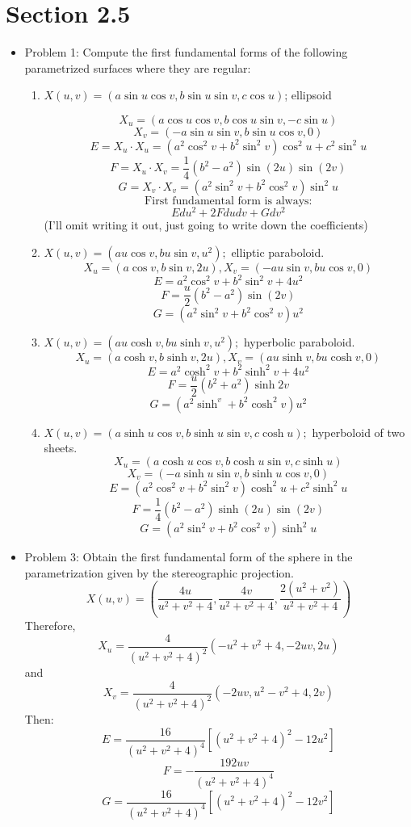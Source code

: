 \documentclass[a4paper,17pt]{extarticle}
\title{\scalebox{1.5}{Math 553 Homework 5}}
\author{\scalebox{1.5}{Theo Koss}}
\date{April 2022}
\theoremstyle{definition}
\renewcommand{\skip}{\par\null\par}
\begin{document}
\maketitle
\section{Section 2.5}
\begin{itemize}
    \item Problem 1: Compute the first fundamental forms of the following parametrized surfaces where they are regular:\begin{enumerate}[label=\textbf{\alph*.}]
        \item $X(u,v)=(a\sin u\cos v,b\sin u\sin v,c\cos u)$; ellipsoid\skip $$X_u=(a\cos u\cos v,b\cos u\sin{v},-c\sin{u})$$ $$X_v=(-a\sin u\sin v,b\sin u\cos v,0)$$ $$E=X_u\cdot X_u=(a^2\cos^2v+b^2\sin^2v)\cos^2u+c^2\sin^2u$$ $$F=X_u\cdot X_v=\frac{1}{4}(b^2-a^2)\sin(2u)\sin(2v)$$ $$G=X_v\cdot X_v=(a^2\sin^2v+b^2\cos^2v)\sin^2u$$
        $$\text{First fundamental form is always:}$$ $$Edu^2+2Fdudv+Gdv^2$$ (I'll omit writing it out, just going to write down the coefficients)
        \item $X(u,v)=(au\cos v,bu\sin v,u^2);$ elliptic paraboloid. $$X_u=(a\cos v,b\sin v,2u),X_v=(-au\sin v,bu\cos v,0)$$ $$E=a^2\cos^2v+b^2\sin^2v+4u^2$$ $$F=\frac{u}{2}(b^2-a^2)\sin(2v)$$ $$G=(a^2\sin^2v+b^2\cos^2v)u^2$$
        \item $X(u,v)=(au\cosh{v},bu\sinh{v},u^2);$ hyperbolic paraboloid. $$X_u=(a\cosh{v},b\sinh{v},2u),X_v=(au\sinh{v},bu\cosh{v},0)$$ $$E=a^2\cosh^2v+b^2\sinh^2v+4u^2$$ $$F=\frac{u}{2}(b^2+a^2)\sinh{2v}$$ $$G=(a^2\sinh^{v}+b^2\cosh^2{v})u^2$$
        \item $X(u,v)=(a\sinh{u}\cos v,b\sinh{u}\sin v,c\cosh{u});$ hyperboloid of two sheets. $$X_u=(a\cosh{u}\cos v,b\cosh{u}\sin v,c\sinh{u})$$ $$X_v=(-a\sinh{u}\sin v,b\sinh{u}\cos v,0)$$ $$E=(a^2\cos^2v+b^2\sin^2v)\cosh^2u+c^2\sinh^2u$$ $$F=\frac{1}{4}(b^2-a^2)\sinh(2u)\sin(2v)$$ $$G=(a^2\sin^2v+b^2\cos^2v)\sinh^2u$$
    \end{enumerate}
    \item Problem 3: Obtain the first fundamental form of the sphere in the parametrization given by the stereographic projection. $$X(u,v)=\left(\frac{4u}{u^2+v^2+4},\frac{4v}{u^2+v^2+4},\frac{2(u^2+v^2)}{u^2+v^2+4}\right)$$ Therefore, $$X_u=\frac{4}{(u^2+v^2+4)^2}(-u^2+v^2+4,-2uv,2u)$$ and $$X_v=\frac{4}{(u^2+v^2+4)^2}(-2uv,u^2-v^2+4,2v)$$ Then: $$E=\frac{16}{(u^2+v^2+4)^4}[(u^2+v^2+4)^2-12u^2]$$ $$F=-\frac{192uv}{(u^2+v^2+4)^4}$$ $$G=\frac{16}{(u^2+v^2+4)^4}[(u^2+v^2+4)^2-12v^2]$$

\end{itemize}
\end{document}

